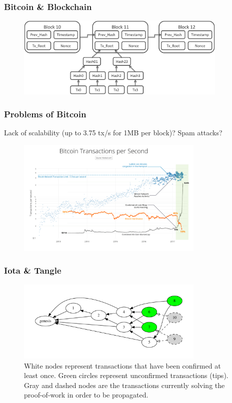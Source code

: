 \documentclass{beamer}
\begin{document}
\begin{frame}
\frametitle{Bitcoin \& Blockchain}

\begin{figure}
\includegraphics[width=0.9\textwidth]{./images-defense/bitcoin-blockchain.png}
\end{figure}

\end{frame}


\begin{frame}
\frametitle{Problems of Bitcoin}

Lack of scalability (up to 3.75 tx/s for 1MB per block)? Spam attacks?

\begin{figure}
\includegraphics[width=0.8\textwidth]{./images-defense/bitcoin-congestion.png}
\end{figure}

\end{frame}


\begin{frame}
\frametitle{Iota \& Tangle}

\begin{figure}
\centering\includegraphics[width=0.8\textwidth]{./images01/fig-tangle-example.pdf}
\caption{White nodes represent transactions that have been confirmed at least once. Green circles represent unconfirmed transactions (tips). Gray and dashed nodes are the transactions currently solving the proof-of-work in order to be propagated.\label{fig-tangle-example}}
\end{figure}

\end{frame}
\end{document}
